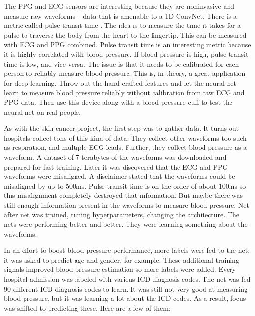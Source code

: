 The PPG and ECG sensors are interesting because they are noninvasive and measure raw waveforms -- data that is amenable to a 1D ConvNet.  There is a metric called pulse transit time \cite{geddes1981pulse}.  The idea is to measure the time it takes for a pulse to traverse the body from the heart to the fingertip.  This can be measured with ECG and PPG combined.  Pulse transit time is an interesting metric because it is highly correlated with blood pressure.  If blood pressure is high, pulse transit time is low, and vice versa.  The issue is that it needs to be calibrated for each person to reliably measure blood pressure.  This is, in theory, a great application for deep learning.  Throw out the hand crafted features and let the neural net learn to measure blood pressure reliably without calibration from raw ECG and PPG data.  Then use this device along with a blood pressure cuff to test the neural net on real people.

As with the skin cancer project, the first step was to gather data.  It turns out hospitals collect tons of this kind of data.  They collect other waveforms too such as respiration, and multiple ECG leads.  Further, they collect blood pressure as a waveform.  A dataset of 7 terabytes of the waveforms was downloaded and prepared for fast training.  Later it was discovered that the ECG and PPG waveforms were misaligned.  A disclaimer stated that the waveforms could be misaligned by up to 500ms. Pulse transit time is on the order of about 100ms so this misalignment completely destroyed that information.  But maybe there was still enough information present in the waveforms to measure blood pressure.  Net after net was trained, tuning hyperparameters, changing the architecture.  The nets were performing better and better.  They were learning something about the waveforms.

In an effort to boost blood pressure performance, more labels were fed to the net: it was asked to predict age and gender, for example.  These additional training signals improved blood pressure estimation so more labels were added.  Every hospital admission was labeled with various ICD diagnosis codes.  The net was fed 90 different ICD diagnosis codes to learn.  It was still not very good at measuring blood pressure, but it was learning a lot about the ICD codes.  As a result, focus was shifted to predicting these.  Here are a few of them:

